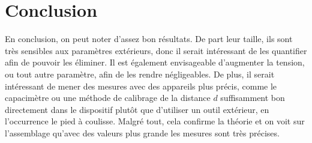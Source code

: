 \documentclass[11pt]{article}
\begin{document}
\section{Conclusion}

En conclusion, on peut noter d'assez bon résultats. De part leur taille, ils sont très sensibles aux paramètres extérieurs, donc il serait intéressant de les quantifier afin de pouvoir les éliminer. Il est également envisageable d'augmenter la tension, ou tout autre paramètre, afin de les rendre négligeables. De plus, il serait intéressant de mener des mesures avec des appareils plus précis, comme le capacimètre ou une méthode de calibrage de la distance $d$ suffisamment bon directement dans le dispositif plutôt que d'utiliser un outil extérieur, en l’occurrence le pied à coulisse. Malgré tout, cela confirme la théorie et on voit sur l'assemblage qu'avec des valeurs plus grande les mesures sont très précises.
\end{document}
